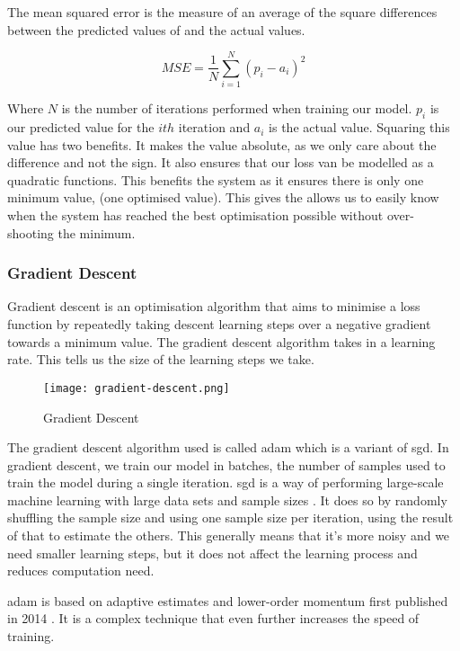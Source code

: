 The mean squared error is the measure of an average of the square differences between the predicted values of and the actual values.

\begin{equation} \label{eqn:mseLossFunction}
    MSE = \frac{1}{N}\sum_{i=1}^{N}{({p_i}-{a_i})}^2 
\end{equation}

Where $N$ is the number of iterations performed when training our model. $p_i$ is our predicted value for the $ith$ iteration and $a_i$ is the actual value. Squaring this value has two benefits. It makes the value absolute, as we only care about the difference and not the sign. It also ensures that our loss van be modelled as a quadratic functions. This benefits the system as it ensures there is only one minimum value, (one optimised value). This gives the allows us to easily know when the system has reached the best optimisation possible without over-shooting the minimum.

\subsubsection{Gradient Descent}
Gradient descent is an optimisation algorithm that aims to minimise a loss function by repeatedly taking descent learning steps over a negative gradient towards a minimum value. The gradient descent algorithm takes in a learning rate. This tells us the size of the learning steps we take. 

\begin{figure}[ht]
    \centering
    \texttt{[image: gradient-descent.png]}
    \caption{Gradient Descent \cite{gradientDescent}}
    \label{fig:gradientDescent}
\end{figure}

The gradient descent algorithm used is called \acrfull{adam} which is a variant of \acrfull{sgd}. In gradient descent, we train our model in batches, the number of samples used to train the model during a single iteration. \acrshort{sgd} is a way of performing large-scale machine learning with large data sets and sample sizes \cite{bottou2010large}. It does so by randomly shuffling the sample size and using one sample size per iteration, using the result of that to estimate the others. This generally means that it's more noisy and we need smaller learning steps, but it does not affect the learning process and reduces computation need.

\acrshort{adam} is based on adaptive estimates and lower-order momentum first published in 2014 \cite{kingma2014adam}. It is a complex technique that even further increases the speed of training.

